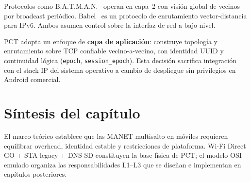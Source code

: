 Protocolos como B.A.T.M.A.N.~\cite{openwrt_batman} operan en capa~2 con visión global de vecinos por broadcast periódico. Babel~\cite{rfc8966} es un protocolo de enrutamiento vector-distancia para IPv6. Ambos asumen control sobre la interfaz de red a bajo nivel.

PCT adopta un enfoque de \textbf{capa de aplicación}: construye topología y enrutamiento sobre TCP confiable vecino-a-vecino, con identidad UUID y continuidad lógica (\texttt{epoch}, \texttt{session\_epoch}). Esta decisión sacrifica integración con el stack IP del sistema operativo a cambio de despliegue sin privilegios en Android comercial.

\section{Síntesis del capítulo}
\label{sec:sintesis-marco-teorico}

El marco teórico establece que las MANET multisalto en móviles requieren equilibrar overhead, identidad estable y restricciones de plataforma. Wi-Fi Direct GO + STA legacy + DNS-SD constituyen la base física de PCT; el modelo OSI emulado organiza las responsabilidades L1--L3 que se diseñan e implementan en capítulos posteriores.
